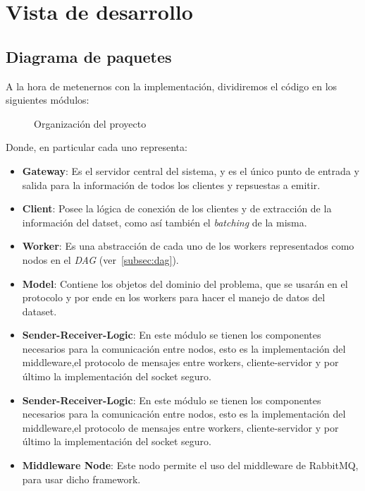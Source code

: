 \section{Vista de desarrollo}
\subsection{Diagrama de paquetes}
A la hora de metenernos con la implementación, dividiremos el código en los siguientes módulos:
\begin{figure}[H]
    \centering
    
    \caption{Organización del proyecto}
    \label{fig:paquetes}
\end{figure}

Donde, en particular cada uno representa:

\begin{itemize}
    \item \textbf{Gateway}: Es el servidor central del sistema, y es el único punto de entrada y salida para la información de todos los clientes y repsuestas a emitir.
    \item \textbf{Client}: Posee la lógica de conexión de los clientes y de extracción de la información del datset, como así también el \textit{batching} de la misma.
    \item \textbf{Worker}: Es una abstracción de cada uno de los workers representados como nodos en el \textit{DAG} (ver~\ref{subsec:dag}).

    \item \textbf{Model}: Contiene los objetos del dominio del problema, que se usarán en el protocolo y por ende en los workers para hacer el manejo de datos del dataset.

    \item \textbf{Sender-Receiver-Logic}: En este módulo se tienen los componentes necesarios para la comunicación entre nodos, esto es la implementación del middleware,el protocolo de mensajes entre workers, cliente-servidor y por último la implementación del socket seguro.

    \item \textbf{Sender-Receiver-Logic}: En este módulo se tienen los componentes necesarios para la comunicación entre nodos, esto es la implementación del middleware,el protocolo de mensajes entre workers, cliente-servidor y por último la implementación del socket seguro.

    \item \textbf{Middleware Node}: Este nodo permite el uso del middleware de RabbitMQ, para usar dicho framework.


\end{itemize}